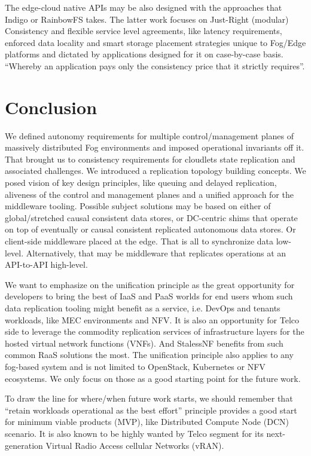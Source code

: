 \documentclass[conference]{IEEEtran}
\begin{document}
The edge-cloud native APIs may be also designed with the approaches that
Indigo\cite{b10} or RainbowFS\cite{b7} takes. The latter work focuses on
Just-Right (modular) Consistency and flexible service level agreements, like
latency requirements, enforced data locality and smart storage placement
strategies unique to Fog/Edge platforms and dictated by applications designed
for it on case-by-case basis. ``Whereby an application pays only the
consistency price that it strictly requires''\cite{b7}.

\section{Conclusion}
We defined autonomy requirements for multiple control/management planes of
massively distributed Fog environments and imposed operational invariants off
it. That brought us to consistency requirements for cloudlets state replication
and associated challenges. We introduced a replication topology building
concepts. We posed vision of key design principles, like queuing and delayed
replication, aliveness of the control and management planes and a unified
approach for the middleware tooling. Possible subject solutions may be based on
either of global/stretched causal consistent data stores, or DC-centric shims
that operate on top of eventually or causal consistent replicated autonomous
data stores. Or client-side middleware placed at the edge. That is all to
synchronize data low-level. Alternatively, that may be middleware that
replicates operations at an API-to-API high-level.

We want to emphasize on the unification principle as the great opportunity for
developers to bring the best of IaaS and PaaS worlds for end users whom such
data replication tooling might benefit as a service, i.e. DevOps and tenants
workloads, like MEC environments and NFV. It is also an opportunity for Telco
side to leverage the commodity replication services of infrastructure layers
for the hosted virtual network functions (VNFs). And StalessNF benefits from
such common RaaS solutions the most. The unification principle also applies to
any fog-based system and is not limited to OpenStack, Kubernetes or NFV
ecosystems. We only focus on those as a good starting point for the future
work.

To draw the line for where/when future work starts, we should remember
that ``retain workloads operational as the best effort'' principle provides a
good start for minimum viable products (MVP), like Distributed Compute Node
(DCN) scenario. It is also known to be highly wanted by Telco segment for its
next-generation Virtual Radio Access cellular Networks (vRAN).
\end{document}
